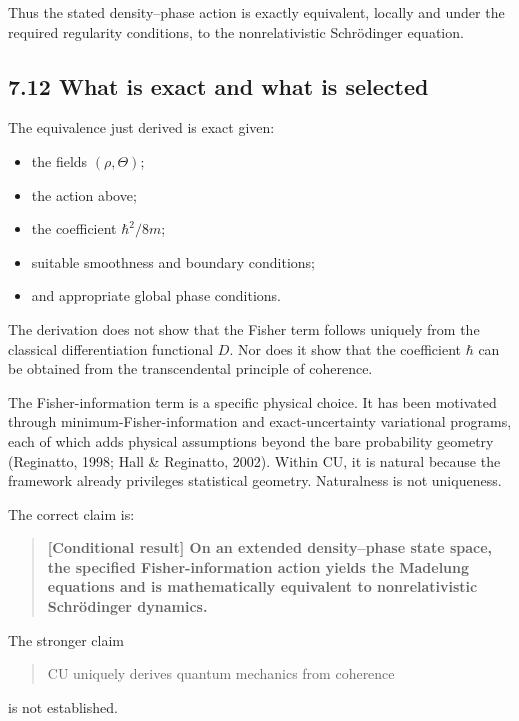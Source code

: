 \documentclass[
  11pt,
]{article}
\providecommand{\tightlist}{%
  \setlength{\itemsep}{0pt}\setlength{\parskip}{0pt}}
\begin{document}
Thus the stated density--phase action is exactly equivalent, locally and
under the required regularity conditions, to the nonrelativistic
Schrödinger equation.

\subsection{7.12 What is exact and what is
selected}\label{what-is-exact-and-what-is-selected}

The equivalence just derived is exact given:

\begin{itemize}
\tightlist
\item
  the fields \((\rho,\Theta)\);
\item
  the action above;
\item
  the coefficient \(\hbar^2/8m\);
\item
  suitable smoothness and boundary conditions;
\item
  and appropriate global phase conditions.
\end{itemize}

The derivation does not show that the Fisher term follows uniquely from
the classical differentiation functional \(D\). Nor does it show that
the coefficient \(\hbar\) can be obtained from the transcendental
principle of coherence.

The Fisher-information term is a specific physical choice. It has been
motivated through minimum-Fisher-information and exact-uncertainty
variational programs, each of which adds physical assumptions beyond the
bare probability geometry (Reginatto, 1998; Hall \& Reginatto, 2002).
Within CU, it is natural because the framework already privileges
statistical geometry. Naturalness is not uniqueness.

The correct claim is:

\begin{quote}
\textbf{{[}Conditional result{]} On an extended density--phase state
space, the specified Fisher-information action yields the Madelung
equations and is mathematically equivalent to nonrelativistic
Schrödinger dynamics.}
\end{quote}

The stronger claim

\begin{quote}
CU uniquely derives quantum mechanics from coherence
\end{quote}

is not established.
\end{document}
